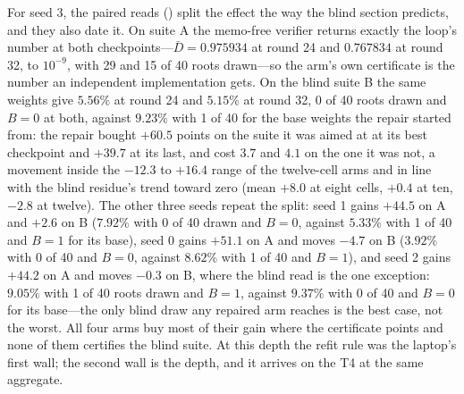 \documentclass[conference]{IEEEtran}
\begin{document}
For seed 3, the paired reads () split the effect the way the blind section predicts, and they also date it. On suite A the memo-free verifier returns exactly the loop's number at both checkpoints---$\bar D=0.975934$ at round 24 and $0.767834$ at round 32, to $10^{-9}$, with 29 and 15 of 40 roots drawn---so the arm's own certificate is the number an independent implementation gets. On the blind suite B the same weights give $5.56\%$ at round 24 and $5.15\%$ at round 32, 0 of 40 roots drawn and $B=0$ at both, against $9.23\%$ with 1 of 40 for the base weights the repair started from: the repair bought $+60.5$ points on the suite it was aimed at at its best checkpoint and $+39.7$ at its last, and cost $3.7$ and $4.1$ on the one it was not, a movement inside the $-12.3$ to $+16.4$ range of the twelve-cell arms and in line with the blind residue's trend toward zero (mean $+8.0$ at eight cells, $+0.4$ at ten, $-2.8$ at twelve). The other three seeds repeat the split: seed 1 gains $+44.5$ on A and $+2.6$ on B ($7.92\%$ with 0 of 40 drawn and $B=0$, against $5.33\%$ with 1 of 40 and $B=1$ for its base), seed 0 gains $+51.1$ on A and moves $-4.7$ on B ($3.92\%$ with 0 of 40 and $B=0$, against $8.62\%$ with 1 of 40 and $B=1$), and seed 2 gains $+44.2$ on A and moves $-0.3$ on B, where the blind read is the one exception: $9.05\%$ with 1 of 40 roots drawn and $B=1$, against $9.37\%$ with 0 of 40 and $B=0$ for its base---the only blind draw any repaired arm reaches is the best case, not the worst. All four arms buy most of their gain where the certificate points and none of them certifies the blind suite. At this depth the refit rule was the laptop's first wall; the second wall is the depth, and it arrives on the T4 at the same aggregate.
\end{document}
